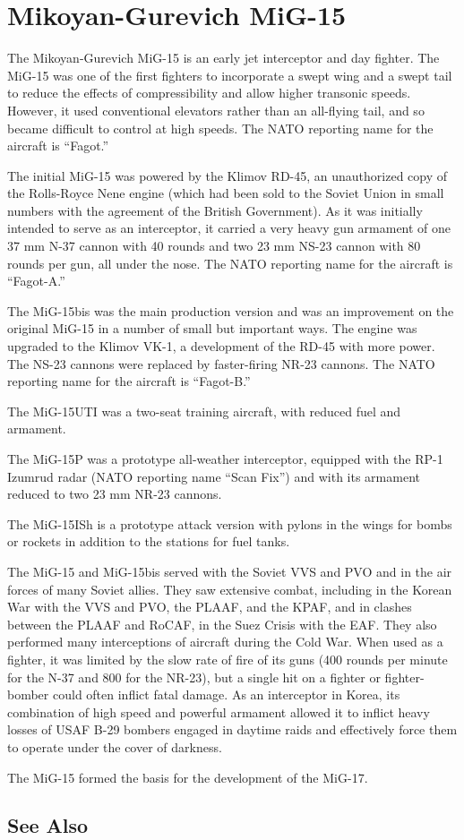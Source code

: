 \section{Mikoyan-Gurevich MiG-15}

The Mikoyan-Gurevich MiG-15 is an early jet interceptor and day fighter. The MiG-15 was one of the first fighters to incorporate a swept wing and a swept tail to reduce the effects of compressibility and allow higher transonic speeds. However, it used conventional elevators rather than an all-flying tail, and so became difficult to control at high speeds. The NATO reporting name for the aircraft is “Fagot.”

The initial MiG-15 was powered by the Klimov RD-45, an unauthorized copy of the Rolls-Royce Nene engine (which had been sold to the Soviet Union in small numbers with the agreement of the British Government). As it was initially intended to serve as an interceptor, it carried a very heavy gun armament of one 37 mm N-37 cannon with 40 rounds and two 23 mm NS-23 cannon with 80 rounds per gun, all under the nose. The NATO reporting name for the aircraft is “Fagot-A.”

The MiG-15bis was the main production version and was an improvement on the original MiG-15 in a number of small but important ways. The engine was upgraded to the Klimov VK-1, a development of the RD-45 with more power. The NS-23 cannons were replaced by faster-firing NR-23 cannons. The NATO reporting name for the aircraft is “Fagot-B.”

The MiG-15UTI was a two-seat training aircraft, with reduced fuel and armament.

The MiG-15P was a prototype all-weather interceptor, equipped with the RP-1 Izumrud radar (NATO reporting name “Scan Fix”) and with its armament reduced to two 23 mm NR-23 cannons.

The MiG-15ISh is a prototype attack version with pylons in the wings for bombs or rockets in addition to the stations for fuel tanks.

The MiG-15 and MiG-15bis served with the Soviet VVS and PVO and in the air forces of many Soviet allies. They saw extensive combat, including in the Korean War with the VVS and PVO, the PLAAF, and the KPAF, and in clashes between the PLAAF and RoCAF, in the Suez Crisis with the EAF. They also performed many interceptions of aircraft during the Cold War. When used as a fighter, it was limited by the slow rate of fire of its guns (400 rounds per minute for the N-37 and 800 for the NR-23), but a single hit on a fighter or fighter-bomber could often inflict fatal damage. As an interceptor in Korea, its combination of high speed and powerful armament allowed it to inflict heavy losses of USAF B-29 bombers engaged in daytime raids and effectively force them to operate under the cover of darkness.

The MiG-15 formed the basis for the development of the MiG-17.

\begin{adclist}
\end{adclist}

\subsection{See Also}
\begin{typelist}
\end{typelist}